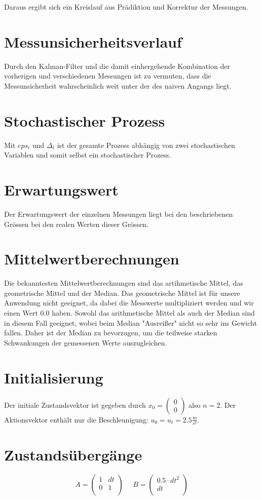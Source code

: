 \documentclass[12pt,a4paper]{article}
\begin{document}
Daraus ergibt sich ein Kreislauf aus Prädiktion und Korrektur der Messungen.

\section{Messunsicherheitsverlauf}
Durch den Kalman-Filter und die damit einhergehende Kombination der vorherigen und verschiedenen Messungen ist zu vermuten, dass die Messunsicherheit wahrscheinlich weit unter der des naiven Angangs liegt.

\section{Stochastischer Prozess}
Mit $eps_t$ und $\Delta_t$ ist der gesamte Prozess abhängig von zwei stochastischen Variablen und somit selbst ein stochastischer Prozess.

\section{Erwartungswert}
Der Erwartungswert der einzelnen Messungen liegt bei den beschriebenen Grössen bei den realen Werten dieser Grössen.

\section{Mittelwertberechnungen}
Die bekanntesten Mittelwertberechnungen sind das artihmetische Mittel, das geometrische Mittel und der Median. Das geometrische Mittel ist für unsere Anwendung nicht geeignet, da dabei die Messwerte multipliziert werden und wir einen Wert 0.0 haben. Sowohl das arithmetische Mittel als auch der Median sind in diesem Fall geeignet, wobei beim Median "Ausreißer" nicht so sehr ins Gewicht fallen. Daher ist der Median zu bevorzugen, um die teilweise starken Schwankungen der gemessenen Werte auszugleichen.

\section{Initialisierung}
Der initiale Zustandsvektor ist gegeben durch $x_0 = \begin{pmatrix}
0 \\ 0 \end{pmatrix}$ also $n = 2$. Der Aktionsvektor enthält nur die Beschleunigung: $u_0 = u_t = 2.5 \frac{m}{s^2}$.

\section{Zustandsübergänge}
\[
A = \begin{pmatrix}
1 & dt \\
0 & 1 \\
\end{pmatrix} \,\,\,\,\,\,\,\,
B = \begin{pmatrix}
0.5 \cdot dt^2 \\
dt \\
\end{pmatrix}
\]
\end{document}

